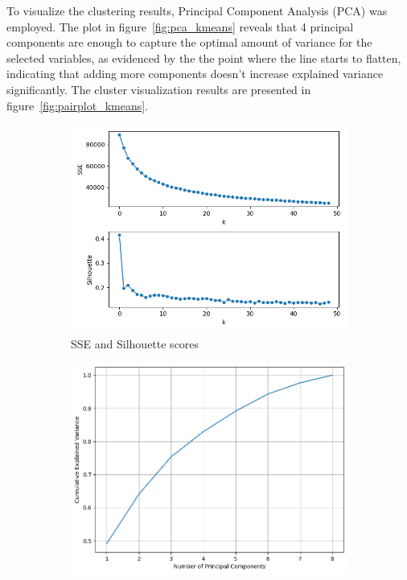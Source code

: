 To visualize the clustering results, Principal Component Analysis (PCA) was employed. The plot in figure~\ref{fig:pca_kmeans} reveals that 4 principal components are enough to capture the optimal amount of variance for the selected variables, as evidenced by the the point where the line starts to flatten, indicating that adding more components doesn't increase explained variance significantly.
The cluster visualization results are presented in figure~\ref{fig:pairplot_kmeans}. 
\begin{figure}[h]
    \centering
    \begin{subfigure}[b]{0.3\textwidth}
        \centering
        \includegraphics[width=\textwidth]{plots/sse_silh_kmeans.png}
        \caption{SSE and Silhouette scores}
        \label{fig:sse_silh_kmeans}
    \end{subfigure}
    \hfill
    \begin{subfigure}[b]{0.3\textwidth}
        \centering
        \includegraphics[width=\textwidth]{plots/pca_kmeans.png}

\end{subfigure}
\end{figure}
